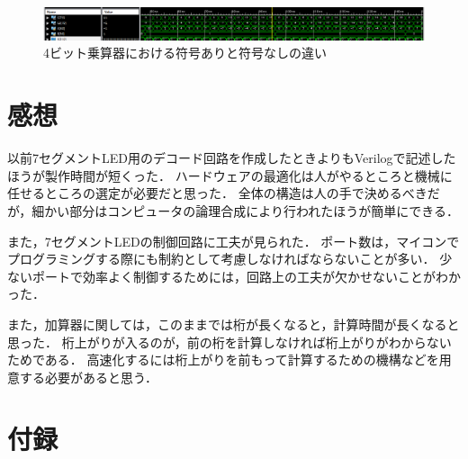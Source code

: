 \begin{figure}[tbp]
  \includegraphics[angle=0,width=160mm]{week3/pics/multi-signed-unsigned.png}
  \centering
  \caption{4ビット乗算器における符号ありと符号なしの違い} %
  \label{fig:mult-sighned-unsigned} %
\end{figure}

\section{感想}
以前7セグメントLED用のデコード回路を作成したときよりもVerilogで記述したほうが製作時間が短くった．
ハードウェアの最適化は人がやるところと機械に任せるところの選定が必要だと思った．
全体の構造は人の手で決めるべきだが，細かい部分はコンピュータの論理合成により行われたほうが簡単にできる．

また，7セグメントLEDの制御回路に工夫が見られた．
ポート数は，マイコンでプログラミングする際にも制約として考慮しなければならないことが多い．
少ないポートで効率よく制御するためには，回路上の工夫が欠かせないことがわかった．

また，加算器に関しては，このままでは桁が長くなると，計算時間が長くなると思った．
桁上がりが入るのが，前の桁を計算しなければ桁上がりがわからないためである．
高速化するには桁上がりを前もって計算するための機構などを用意する必要があると思う．


\clearpage
\section{付録}













